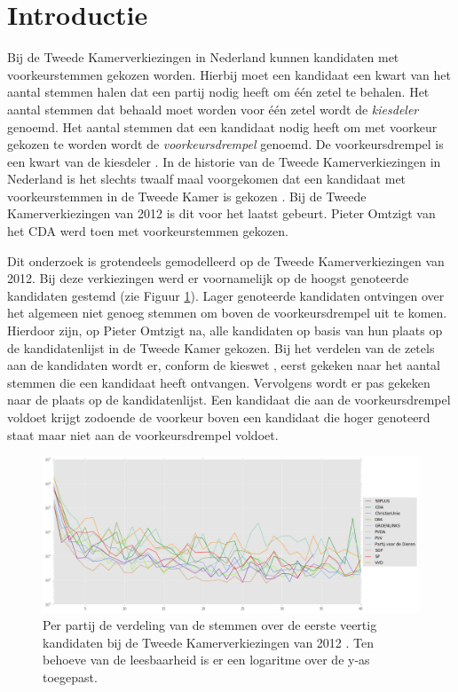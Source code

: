 \section{Introductie}
\label{sec:intro}
Bij de Tweede Kamerverkiezingen in Nederland kunnen kandidaten met voorkeurstemmen gekozen worden. Hierbij moet een kandidaat een kwart van het aantal stemmen halen dat een partij nodig heeft om één zetel te behalen. Het aantal stemmen dat behaald moet worden voor één zetel wordt de \textit{kiesdeler} genoemd. Het aantal stemmen dat een kandidaat nodig heeft om met voorkeur gekozen te worden wordt de \textit{voorkeursdrempel} genoemd. De voorkeursdrempel is een kwart van de kiesdeler  \citep{Kiesraad_voorkeursdrempel2}.  In de historie van de Tweede Kamerverkiezingen in Nederland is het slechts twaalf maal voorgekomen dat een kandidaat met voorkeurstemmen in de Tweede Kamer is gekozen \citep{Voork74:online}. Bij de Tweede Kamerverkiezingen van 2012 is dit voor het laatst gebeurt. Pieter Omtzigt van het CDA werd toen met voorkeurstemmen gekozen.\

Dit onderzoek is grotendeels gemodelleerd op de Tweede Kamerverkiezingen van 2012. Bij deze verkiezingen werd er voornamelijk op de hoogst genoteerde kandidaten gestemd (zie Figuur \ref{fig:sv2012}). Lager genoteerde kandidaten ontvingen over het algemeen niet genoeg stemmen om boven de voorkeursdrempel uit te komen. Hierdoor zijn, op Pieter Omtzigt na, alle kandidaten op basis van hun plaats op de kandidatenlijst in de Tweede Kamer gekozen. Bij het verdelen van de zetels aan de kandidaten wordt er, conform de kieswet \citeyearpar{kieswetje}, eerst gekeken naar het aantal stemmen die een kandidaat heeft ontvangen. Vervolgens wordt er pas gekeken naar de plaats op de kandidatenlijst. Een kandidaat die aan de voorkeursdrempel voldoet krijgt zodoende de voorkeur boven een kandidaat die hoger genoteerd staat maar niet aan de voorkeursdrempel voldoet. 


\begin{figure}[H]


	\includegraphics[width=\linewidth]{verdeling_stemmen_2012.png}

			\caption{Per partij de verdeling van de stemmen over de eerste veertig kandidaten bij de Tweede Kamerverkiezingen van 2012 \citep{Kiesraad_databank}. Ten behoeve van de leesbaarheid is er een logaritme over de y-as toegepast.}

\label{fig:sv2012}
\end{figure}

